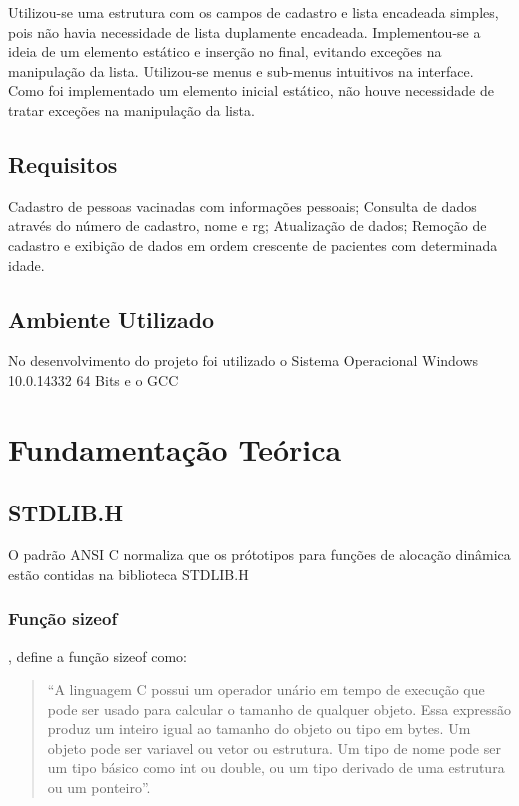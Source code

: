 \documentclass[12pt]{article}
\begin{document}
Utilizou-se uma estrutura com os campos de cadastro e lista encadeada simples, pois não havia necessidade de lista duplamente
encadeada. Implementou-se a ideia de um elemento estático e inserção no final, evitando exceções na manipulação da lista.
Utilizou-se menus e sub-menus intuitivos na interface. Como foi implementado um elemento inicial estático, não houve necessidade
de tratar exceções na manipulação da lista.      

\subsection{Requisitos}

Cadastro de pessoas vacinadas com informações pessoais; Consulta de dados através do número de cadastro, nome e rg; Atualização de dados; Remoção
de cadastro e exibição de dados em ordem crescente de pacientes com determinada idade.

\subsection{Ambiente Utilizado}

No desenvolvimento do projeto foi utilizado o Sistema Operacional Windows 10.0.14332 64 Bits e
o GCC 

\section{Fundamentação Teórica}

\subsection{STDLIB.H}

O padrão ANSI C normaliza que os prótotipos para funções de alocação dinâmica
estão contidas na biblioteca STDLIB.H

\subsubsection{Função sizeof}
 
  \cite{kernighan1988c}, define a função sizeof como:
\begin{quotation}

``A linguagem C possui um operador unário em tempo de execução que pode ser usado para calcular
o tamanho de qualquer objeto. Essa expressão produz um inteiro igual ao tamanho do 
objeto ou tipo em bytes. Um objeto pode ser variavel ou vetor ou estrutura. Um tipo de nome
pode ser um tipo básico como int ou double, ou um tipo derivado de uma estrutura ou um ponteiro''.
\end{quotation}
\end{document}
